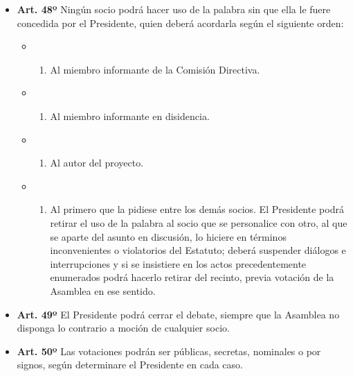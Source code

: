 \documentclass[]{book}
\providecommand{\tightlist}{%
  \setlength{\itemsep}{0pt}\setlength{\parskip}{0pt}}
\begin{document}
\begin{itemize}
\tightlist
\item
  \textbf{Art. 48º}
  Ningún socio podrá hacer uso de la palabra sin que ella le fuere concedida por el Presidente, quien deberá acordarla según el siguiente orden:

  \begin{itemize}
  \item
    \begin{enumerate}
    \def\labelenumi{\alph{enumi})}
    \tightlist
    \item
      Al miembro informante de la Comisión Directiva.
    \end{enumerate}
  \item
    \begin{enumerate}
    \def\labelenumi{\alph{enumi})}
    \setcounter{enumi}{1}
    \tightlist
    \item
      Al miembro informante en disidencia.
    \end{enumerate}
  \item
    \begin{enumerate}
    \def\labelenumi{\alph{enumi})}
    \setcounter{enumi}{2}
    \tightlist
    \item
      Al autor del proyecto.
    \end{enumerate}
  \item
    \begin{enumerate}
    \def\labelenumi{\alph{enumi})}
    \setcounter{enumi}{3}
    \tightlist
    \item
      Al primero que la pidiese entre los demás socios. El Presidente podrá retirar el uso de la palabra al socio que se personalice con otro, al que se aparte del asunto en discusión, lo hiciere en términos inconvenientes o violatorios del Estatuto; deberá suspender diálogos e interrupciones y si se insistiere en los actos precedentemente enumerados podrá hacerlo retirar del recinto, previa votación de la Asamblea en ese sentido.
    \end{enumerate}
  \end{itemize}
\end{itemize}

\begin{itemize}
\tightlist
\item
  \textbf{Art. 49º}
  El Presidente podrá cerrar el debate, siempre que la Asamblea no disponga lo contrario a moción de cualquier socio.
\end{itemize}

\begin{itemize}
\tightlist
\item
  \textbf{Art. 50º}
  Las votaciones podrán ser públicas, secretas, nominales o por signos, según determinare el Presidente en cada caso.
\end{itemize}
\end{document}
